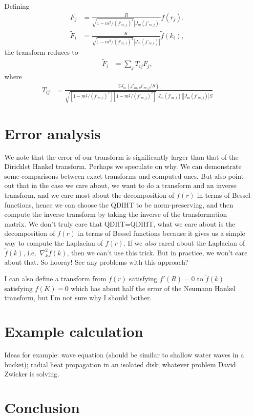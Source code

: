 \documentclass[aip,amsmath,amssymb,reprint,twocolumn]{revtex4-1}
\newcommand{\abs}[1]{\left|#1\right|}
\begin{document}
\begin{widetext}
Defining
\begin{align}
    F_j &= \frac{R}{\sqrt{1-m^2/(j'_{m,j})^2} \abs{J_m(j'_{m,j})}} f(r_j), \\
    \tilde{F}_i &= \frac{K}{\sqrt{1-m^2/(j'_{m,i})^2} \abs{J_m(j'_{m,i})}}  \tilde{f}(k_i),
\end{align}
the transform reduces to
\begin{align}
    \tilde{F}_i &= \sum_j T_{ij} F_j,
\end{align}
where
\begin{align}
    T_{ij} &= \frac{2 J_m(j'_{m,i} j'_{m,j}/S)}{\sqrt{\left[1-m^2/(j'_{m,i})^2\right]\left[1-m^2/(j'_{m,j})^2\right]} \abs{J_m(j'_{m,i})} \abs{J_m(j'_{m,j})} S}
\end{align}
\end{widetext}


\section{Error analysis}
\label{sec:ErrorAnalysis}

We note that the error of our transform is significantly larger than that of the Dirichlet Hankel transform.  Perhaps we speculate on why.  We can demonstrate some comparisons between exact transforms and computed ones.  But also point out that in the case we care about, we want to do a transform and an inverse transform, and we care most about the decomposition of $f(r)$ in terms of Bessel functions, hence we can choose the QDIHT to be norm-preserving, and then compute the inverse transform by taking the inverse of the transformation matrix.  We don't truly care that QDHT=QDIHT, what we care about is the decomposition of $f(r)$ in terms of Bessel functions because it gives us a simple way to compute the Laplacian of $f(r)$.  If we \emph{also} cared about the Laplacian of $\tilde{f}(k)$, i.e.\ $\nabla_k^2 f(k)$, then we can't use this trick.  But in practice, we won't care about that. So hooray!  See any problems with this approach?

I can also define a transform from $f(r)$ satisfying $f'(R)=0$ to $\tilde{f}(k)$ satisfying $f(K)=0$ which has about half the error of the Neumann Hankel transform, but I'm not sure why I should bother.

\section{Example calculation}
\label{sec:Example}
Ideas for example: wave equation (should be similar to shallow water waves in a bucket); radial heat propagation in an isolated disk; whatever problem David Zwicker is solving.

\section{Conclusion}
\label{sec:Conclusion}




\end{document}
